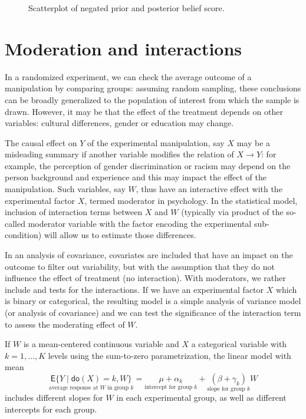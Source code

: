 \documentclass[
  11pt,
  letterpaper,
]{scrbook}
\theoremstyle{definition}
\theoremstyle{definition}
\theoremstyle{remark}
\begin{document}
\begin{figure}[ht!]


\caption{\label{fig-vanStekS3f1}Scatterplot of negated prior and
posterior belief score.}

\end{figure}%

\section{Moderation and interactions}\label{moderation-and-interactions}

In a randomized experiment, we can check the average outcome of a
manipulation by comparing groups: assuming random sampling, these
conclusions can be broadly generalized to the population of interest
from which the sample is drawn. However, it may be that the effect of
the treatment depends on other variables: cultural differences, gender
or education may change.

The causal effect on \(Y\) of the experimental manipulation, say \(X\)
may be a misleading summary if another variable modifies the relation of
\(X \to Y\): for example, the perception of gender discrimination or
racism may depend on the person background and experience and this may
impact the effect of the manipulation. Such variables, say \(W\), thus
have an interactive effect with the experimental factor \(X\), termed
moderator in psychology. In the statistical model, inclusion of
interaction terms between \(X\) and \(W\) (typically via product of the
so-called moderator variable with the factor encoding the experimental
sub-condition) will allow us to estimate those differences.

In an analysis of covariance, covariates are included that have an
impact on the outcome to filter out variability, but with the assumption
that they do not influence the effect of treatment (no interaction).
With moderators, we rather include and tests for the interactions. If we
have an experimental factor \(X\) which is binary or categorical, the
resulting model is a simple analysis of variance model (or analysis of
covariance) and we can test the significance of the interaction term to
assess the moderating effect of \(W\).

If \(W\) is a mean-centered continuous variable and \(X\) a categorical
variable with \(k=1, \ldots, K\) levels using the sum-to-zero
parametrization, the linear model with mean \[
\underset{\text{average response at $W$ in group $k$}}{\mathsf{E}\{Y \mid \mathsf{do}(X) = k, W\}} = \underset{\text{intercept for group $k$}}{\mu + \alpha_k} + \underset{\text{slope for group $k$}}{(\beta + \gamma_k)}W
\] includes different slopes for \(W\) in each experimental group, as
well as different intercepts for each group.
\end{document}
